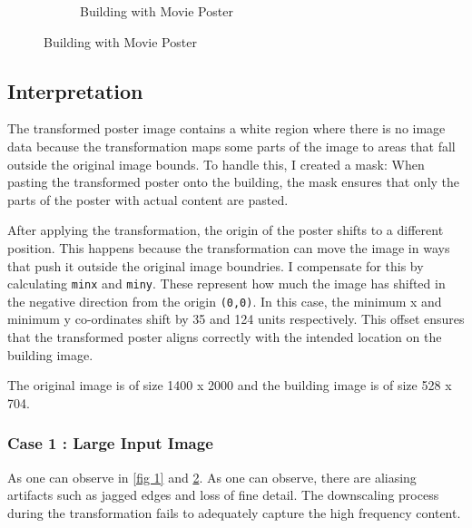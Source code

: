 \documentclass{article}
\begin{document}
\begin{figure}[H]
\begin{subfigure}{.3\textwidth}
        \caption{Building with Movie Poster}  
        \label{fig 2}
    \end{subfigure}
\end{figure}

\subsection{Interpretation}
The transformed poster image contains a white region where there is no image data because the transformation maps some parts of the image
to areas that fall outside the original image bounds. To handle this, I created a mask: When pasting the transformed poster onto the building, 
the mask ensures that only the parts of the poster with actual content are pasted.

After applying the transformation, the origin of the poster shifts to a different position. This happens because the transformation can move the 
image in ways that push it outside the original image boundries. I compensate for this by calculating \texttt{minx} and \texttt{miny}. These
represent how much the image has shifted in the negative direction from the origin \texttt{(0,0)}. In this case, the minimum x and minimum y co-ordinates
shift by 35 and 124 units respectively. This offset ensures that the transformed poster aligns correctly with the intended location on the building image.


The original image is of size 1400 x 2000 and the building image is of size 528 x 704. 
\subsubsection{Case 1 : Large Input Image}
As one can observe in \ref{fig 1} and \ref{fig 2}. 
As one can observe, there are aliasing artifacts such as jagged edges and loss of fine detail. The downscaling process during the transformation 
fails to adequately capture the high frequency content. 
\end{document}
